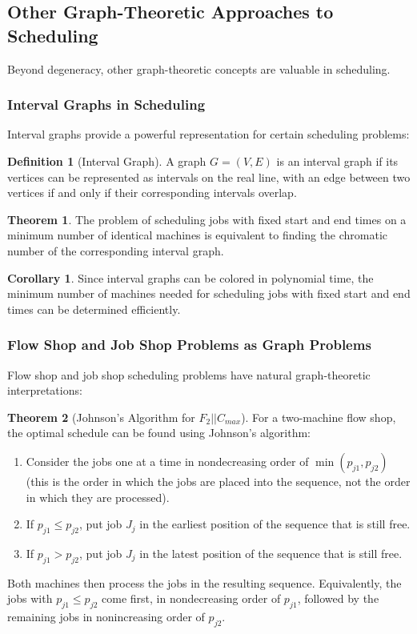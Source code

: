 \documentclass{article}
\theoremstyle{definition}
\newtheorem{theorem}{Theorem}
\newtheorem{corollary}{Corollary}
\newtheorem{definition}{Definition}
\begin{document}
\subsection*{Other Graph-Theoretic Approaches to Scheduling}

Beyond degeneracy, other graph-theoretic concepts are valuable in scheduling.

\subsubsection*{Interval Graphs in Scheduling}

Interval graphs provide a powerful representation for certain scheduling problems:

\begin{definition}[Interval Graph]
A graph $G = (V, E)$ is an interval graph if its vertices can be represented as intervals on the real line, with an edge between two vertices if and only if their corresponding intervals overlap.
\end{definition}

\begin{theorem}
The problem of scheduling jobs with fixed start and end times on a minimum number of identical machines is equivalent to finding the chromatic number of the corresponding interval graph.
\end{theorem}

\begin{corollary}
Since interval graphs can be colored in polynomial time, the minimum number of machines needed for scheduling jobs with fixed start and end times can be determined efficiently.
\end{corollary}

\subsubsection*{Flow Shop and Job Shop Problems as Graph Problems}

Flow shop and job shop scheduling problems have natural graph-theoretic interpretations:

\begin{theorem}[Johnson's Algorithm for $F_2||C_{max}$]
For a two-machine flow shop, the optimal schedule can be found using Johnson's algorithm:
\begin{enumerate}
    \item Consider the jobs one at a time in nondecreasing order of $\min(p_{j1}, p_{j2})$ (this is the order in which the jobs are placed into the sequence, not the order in which they are processed).
    \item If $p_{j1} \leq p_{j2}$, put job $J_j$ in the earliest position of the sequence that is still free.
    \item If $p_{j1} > p_{j2}$, put job $J_j$ in the latest position of the sequence that is still free.
\end{enumerate}
Both machines then process the jobs in the resulting sequence. Equivalently, the jobs with $p_{j1} \leq p_{j2}$ come first, in nondecreasing order of $p_{j1}$, followed by the remaining jobs in nonincreasing order of $p_{j2}$.
\end{theorem}
\end{document}
